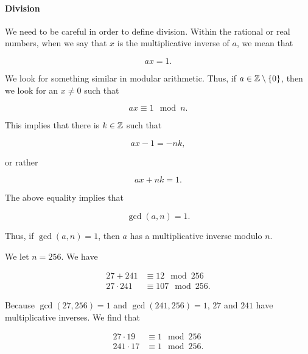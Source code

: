 \paragraph{Division} We need to be careful in order to define division.
Within the rational or real numbers, when we say that $x$
is the multiplicative inverse of $a$,
we mean that

\begin{equation}
    ax = 1.
\end{equation}

We look for something similar in modular arithmetic.
Thus, if $a\in\mathbb{Z}\setminus\left\{ 0 \right\}$, then we look for an $x\ne0$ such that

\begin{equation}
    ax \equiv 1 \mod n.
\end{equation}

\noindent
This implies that there is $k\in\mathbb{Z}$ such that

\begin{equation}
    ax - 1 = -nk,
\end{equation}

\noindent
or rather

\begin{equation}
    ax + nk = 1.
\end{equation}

The above equality implies that

\begin{equation}
    \gcd(a,n) = 1.
\end{equation}

\noindent
Thus, if $\gcd(a,n) = 1$, then $a$ has a multiplicative inverse
modulo $n$.

\begin{example}

We let $n = 256$.
We have

\begin{align}
    27 + 241 &\equiv 12 \mod 256 \nonumber\\
    27 \cdot 241 &\equiv 107 \mod 256.
\end{align}

\noindent
Because $\gcd(27,256) = 1$ and $\gcd(241,256) = 1$,
$27$ and $241$ have multiplicative inverses.
We find that

\begin{align}
    27 \cdot 19 &\equiv 1 \mod 256 \nonumber\\
    241 \cdot 17 &\equiv 1 \mod 256.
\end{align}
\end{example}
